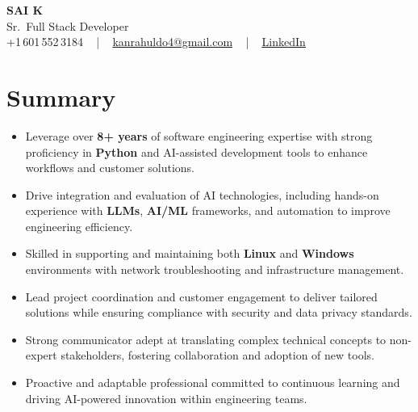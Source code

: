 \documentclass[letterpaper,11pt]{article}
\newcommand{\resumeItem}[1]{
  \item\footnotesize{
    {#1 \vspace{-2pt}}
  }
}
\newcommand{\resumeItemListStart}{\begin{itemize}[leftmargin=*]}
\newcommand{\resumeItemListEnd}{\end{itemize}\vspace{-5pt}}
\begin{document}
\begin{center}
    {\fontsize{14pt}{12pt}\selectfont \textbf{\MakeUppercase{Sai K}}}\\ \vspace{2pt}
    \fontsize{10pt}{12pt}\selectfont Sr.\ Full Stack Developer\\ \vspace{2pt}
    \fontsize{10pt}{12pt}\selectfont +1\,601\,552\,3184 ~ | ~
    \href{mailto:kanrahuldo4@gmail.com}{kanrahuldo4@gmail.com} ~ | ~
    \href{https://www.linkedin.com/in/srrrk/}{\color{blue}\underline{LinkedIn}}
    \vspace{-10pt}
\end{center}

\section{Summary}
\fontsize{9pt}{10pt}\selectfont
\resumeItemListStart
  \resumeItem{Leverage over \textbf{8+ years} of software engineering expertise with strong proficiency in \textbf{Python} and AI-assisted development tools to enhance workflows and customer solutions.}
  \resumeItem{Drive integration and evaluation of AI technologies, including hands-on experience with \textbf{LLMs}, \textbf{AI/ML} frameworks, and automation to improve engineering efficiency.}
  \resumeItem{Skilled in supporting and maintaining both \textbf{Linux} and \textbf{Windows} environments with network troubleshooting and infrastructure management.}
  \resumeItem{Lead project coordination and customer engagement to deliver tailored solutions while ensuring compliance with security and data privacy standards.}
  \resumeItem{Strong communicator adept at translating complex technical concepts to non-expert stakeholders, fostering collaboration and adoption of new tools.}
  \resumeItem{Proactive and adaptable professional committed to continuous learning and driving AI-powered innovation within engineering teams.}
\resumeItemListEnd
\vspace{-6pt}

\end{document}
